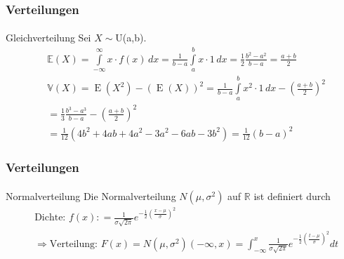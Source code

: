 \documentclass{beamer}
\begin{document}
\begin{frame}
    \frametitle{Verteilungen}
\framesubtitle{}

\begin{block}{Gleichverteilung}
Sei $X \sim $U(a,b).
\begin{align*}
& \mathbb{E}(X) =\int\limits_{-\infty}^\infty x \cdot f(x)\,dx = \frac 1{b-a}\int\limits_a^b x\cdot 1\,dx = \frac 12\frac{b^2-a^2}{b-a} = \frac{a+b}2 \\
& \mathbb{V}(X) = \operatorname{E}(X^2) - \left({\operatorname{E}(X)} \right)^2  = \frac{1}{b - a}\int\limits_a^b {x^2 \cdot 1\,dx}  - \left( {\frac{a + b}{2}} \right)^2  \\
 & = \frac{1}{3}\frac{b^3  - a^3}{b - a} - \left( {\frac{a + b}{2}} \right)^2 \\
    &= \frac{1}{12}\left( {4b^2  + 4ab + 4a^2  - 3a^2  - 6ab - 3b^2 } \right) = \frac{1}{12}(b - a)^2
\end{align*}
\end{block}
 \end{frame}



\begin{frame}
    \frametitle{Verteilungen}
\framesubtitle{}

\begin{block}{Normalverteilung}
Die Normalverteilung $N{(\mu,\sigma^2)}$ auf $\mathbb{R}$ ist definiert durch
\begin{align*}
& \text{Dichte: } f (x) : = \frac 1{\sigma \sqrt{2\pi}}e^{- \frac {1}{2} (\frac{x- \mu}{ \sigma})^2} \\
&  \Rightarrow \text{Verteilung: } F(x) = N{(\mu,\sigma^2)}(-\infty , x) =  \int_{-\infty}^{x}  \frac 1{\sigma \sqrt{2\pi}}e^{- \frac {1}{2} (\frac{t- \mu}{ \sigma})^2}dt\\
\end{align*}

\end{block}
 \end{frame}
\end{document}

